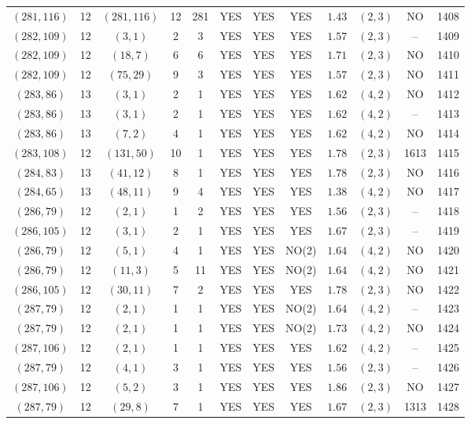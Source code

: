 \begin{longtable}{|c|c|c|c|c|c|c|c|c|c|c|c|}
$(281,116)$ & 12 & $(281,116)$ & 12 & 281 & YES & YES & YES & $1.43$ & $(2,3)$ & NO & 1408\\
$(282,109)$ & 12 & $(3,1)$ & 2 & 3 & YES & YES & YES & $1.57$ & $(2,3)$ & -- & 1409\\
$(282,109)$ & 12 & $(18,7)$ & 6 & 6 & YES & YES & YES & $1.71$ & $(2,3)$ & NO & 1410\\
$(282,109)$ & 12 & $(75,29)$ & 9 & 3 & YES & YES & YES & $1.57$ & $(2,3)$ & NO & 1411\\
$(283,86)$ & 13 & $(3,1)$ & 2 & 1 & YES & YES & YES & $1.62$ & $(4,2)$ & NO & 1412\\
$(283,86)$ & 13 & $(3,1)$ & 2 & 1 & YES & YES & YES & $1.62$ & $(4,2)$ & -- & 1413\\
$(283,86)$ & 13 & $(7,2)$ & 4 & 1 & YES & YES & YES & $1.62$ & $(4,2)$ & NO & 1414\\
$(283,108)$ & 12 & $(131,50)$ & 10 & 1 & YES & YES & YES & $1.78$ & $(2,3)$ & 1613 & 1415\\
$(284,83)$ & 13 & $(41,12)$ & 8 & 1 & YES & YES & YES & $1.78$ & $(2,3)$ & NO & 1416\\
$(284,65)$ & 13 & $(48,11)$ & 9 & 4 & YES & YES & YES & $1.38$ & $(4,2)$ & NO & 1417\\
$(286,79)$ & 12 & $(2,1)$ & 1 & 2 & YES & YES & YES & $1.56$ & $(2,3)$ & -- & 1418\\
$(286,105)$ & 12 & $(3,1)$ & 2 & 1 & YES & YES & YES & $1.67$ & $(2,3)$ & -- & 1419\\
$(286,79)$ & 12 & $(5,1)$ & 4 & 1 & YES & YES & NO(2) & $1.64$ & $(4,2)$ & NO & 1420\\
$(286,79)$ & 12 & $(11,3)$ & 5 & 11 & YES & YES & NO(2) & $1.64$ & $(4,2)$ & NO & 1421\\
$(286,105)$ & 12 & $(30,11)$ & 7 & 2 & YES & YES & YES & $1.78$ & $(2,3)$ & NO & 1422\\
$(287,79)$ & 12 & $(2,1)$ & 1 & 1 & YES & YES & NO(2) & $1.64$ & $(4,2)$ & -- & 1423\\
$(287,79)$ & 12 & $(2,1)$ & 1 & 1 & YES & YES & NO(2) & $1.73$ & $(4,2)$ & NO & 1424\\
$(287,106)$ & 12 & $(2,1)$ & 1 & 1 & YES & YES & YES & $1.62$ & $(4,2)$ & -- & 1425\\
$(287,79)$ & 12 & $(4,1)$ & 3 & 1 & YES & YES & YES & $1.56$ & $(2,3)$ & -- & 1426\\
$(287,106)$ & 12 & $(5,2)$ & 3 & 1 & YES & YES & YES & $1.86$ & $(2,3)$ & NO & 1427\\
$(287,79)$ & 12 & $(29,8)$ & 7 & 1 & YES & YES & YES & $1.67$ & $(2,3)$ & 1313 & 1428\\

\end{longtable}
